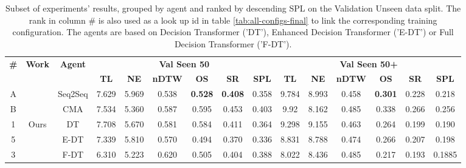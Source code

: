 \begin{table}
\centering
\caption{\label{tab:best_seen_50}Subset of experiments' results, grouped by agent and ranked by descending SPL on the Validation Unseen data split. The rank in column \# is also used as a look up id in table \ref{tab:all-configs-final} to link the corresponding training configuration.     \newline The agents are based on Decision Transformer ('DT'), Enhanced Decision Transformer ('E-DT') or Full Decision Transformer ('F-DT').}
\begin{tabular}{@{\hskip3pt}c@{\hskip3pt}c@{\hskip3pt}c@{\hskip3pt}c@{\hskip3pt}c@{\hskip3pt}c@{\hskip3pt}c@{\hskip3pt}c@{\hskip3pt}c@{\hskip3pt}c@{\hskip3pt}c@{\hskip3pt}c@{\hskip3pt}c@{\hskip3pt}c@{\hskip3pt}c}
\toprule
\textbf{\#} & \textbf{Work} & \textbf{Agent} & \multicolumn{6}{c}{\textbf{Val Seen 50}} & \multicolumn{6}{c}{\textbf{Val Seen 50+}} \\
\cmidrule(l){4-9}\cmidrule(l){10-15}\textbf{~} &     \textbf{~} &                \textbf{~} &       \textbf{TL} &    \textbf{NE} &   \textbf{nDTW} &     \textbf{OS} &    \textbf{SR} &    \textbf{SPL} &         \textbf{TL} &     \textbf{NE} &   \textbf{nDTW} &     \textbf{OS} &    \textbf{SR} &    \textbf{SPL} \\
\midrule
          A &             \citet{VLNCE}  &                  Seq2Seq &             7.629 &          5.969 &           0.538 &  \textbf{ 0.528} &  \textbf{ 0.408} &           0.358 &                9.784 &           8.993 &           0.458 &  \textbf{0.301} &  0.228 &  0.218 \\
          B &            &  CMA &             7.534 &          5.360 &           0.587 &           0.595 &          0.453 &           0.403 &               9.92 &           8.162 &           0.485 &           0.338 &          0.266 &           0.256 \\
\midrule
          1 &            Ours  &                  DT &             7.708&          5.670 &           0.581 &   0.584 &  0.411 &           0.364 &                9.298 &     9.155      &    0.463       &  0.264 & 0.199  &  0.190 \\
          5 &            &  E-DT &             7.339 &          5.810 &           0.570 &           0.494 &       0.370    &       0.336     &              8.831 &           8.788 &           0.474 &           0.266 &          0.207 &           0.198 \\
          3 &            &  F-DT &              6.310 &  5.223 &  0.620 &        0.505    &        0.404   &    0.388 &               8.022 &  8.436 &  0.485 &       0.217      &          0.193 &           0.1885 \\
\bottomrule
\end{tabular}
\end{table}
